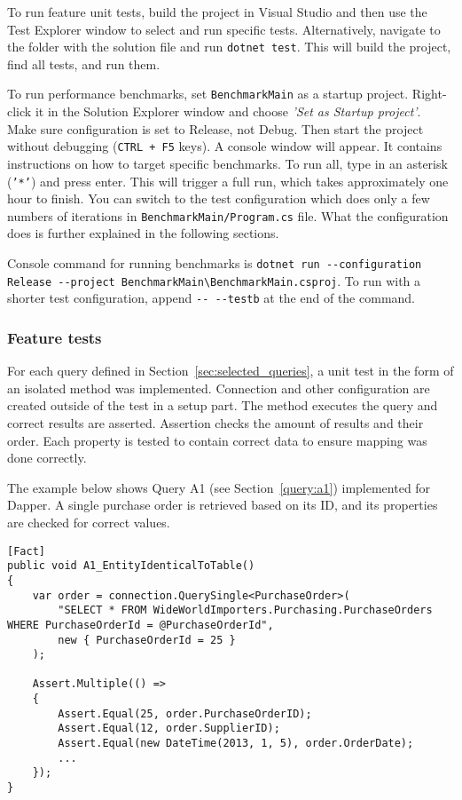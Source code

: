 To run feature unit tests, build the project in Visual Studio and then use the Test Explorer window to select and run specific tests. Alternatively, navigate to the folder with the solution file and run \lstinline{dotnet test}. This will build the project, find all tests, and run them. 

To run performance benchmarks, set \texttt{BenchmarkMain} as a startup project. Right-click it in the Solution Explorer window and choose \textit{'Set as Startup project'}. Make sure configuration is set to Release, not Debug. Then start the project without debugging (\texttt{CTRL + F5} keys). A console window will appear. It contains instructions on how to target specific benchmarks. To run all, type in an asterisk (\texttt{'*'}) and press enter. This will trigger a full run, which takes approximately one hour to finish. You can switch to the test configuration which does only a few numbers of iterations in \texttt{BenchmarkMain/Program.cs} file. What the configuration does is further explained in the following sections. 

Console command for running benchmarks is \lstinline{dotnet run --configuration Release --project BenchmarkMain\BenchmarkMain.csproj}. To run with a shorter test configuration, append \lstinline{-- --testb} at the end of the command.

\subsubsection{Feature tests}
For each query defined in Section~\ref{sec:selected_queries}, a unit test in the form of an isolated method was implemented. Connection and other configuration are created outside of the test in a setup part. The method executes the query and correct results are asserted. Assertion checks the amount of results and their order. Each property is tested to contain correct data to ensure mapping was done correctly.

The example below shows Query A1 (see Section~\ref{query:a1}) implemented for Dapper. A single purchase order is retrieved based on its ID, and its properties are checked for correct values. 
\begin{lstlisting}[language=CSharp]
[Fact]
public void A1_EntityIdenticalToTable()
{
    var order = connection.QuerySingle<PurchaseOrder>(
        "SELECT * FROM WideWorldImporters.Purchasing.PurchaseOrders WHERE PurchaseOrderId = @PurchaseOrderId",
        new { PurchaseOrderId = 25 }
    );

    Assert.Multiple(() =>
    {
        Assert.Equal(25, order.PurchaseOrderID);
        Assert.Equal(12, order.SupplierID);
        Assert.Equal(new DateTime(2013, 1, 5), order.OrderDate);
        ...
    });
}
\end{lstlisting}

